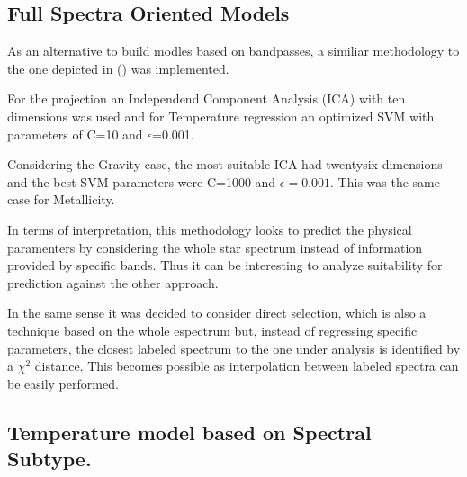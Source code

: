 \subsection{Full Spectra Oriented Models}
\label {ssub:GM_BPG}
{
As an alternative to build modles based on bandpasses, 
a similiar methodology to the one depicted in (\cite{2013A&A...550A.120S})
was implemented.

For the projection an Independend Component Analysis (ICA) with ten dimensions
was used and for Temperature regression an optimized SVM 
with parameters of C=10 and $\epsilon$=0.001.

Considering the Gravity case, the most suitable ICA had twentysix dimensions and the 
best SVM parameters were C=1000 and $\epsilon = 0.001 $. This was the same case
for Metallicity.

In terms of interpretation, this methodology looks to predict the physical paramenters
by considering the whole star spectrum instead of information provided 
by specific bands. Thus it can be interesting to analyze suitability 
for prediction against the other approach.

In the same sense it was decided to consider direct selection, which is
also a technique based on the whole espectrum but, instead of regressing
specific parameters, the closest labeled spectrum to the one 
under analysis is identified by a $\chi^2$ distance.
This becomes possible as interpolation between labeled spectra can be
easily performed.

}

\subsection{Temperature model based on Spectral Subtype.}
\label {ssub:TLSB}
{
}

